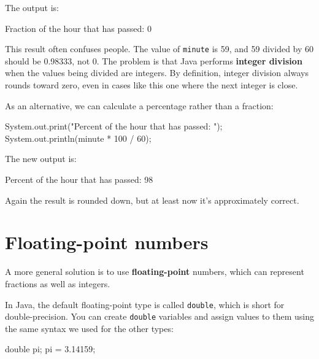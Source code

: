 \documentclass[12pt]{book}
\theoremstyle{exercise}
\newcommand{\java}[1]{\verb"#1"}
\begin{document}
The output is:

\begin{stdout}
Fraction of the hour that has passed: 0
\end{stdout}


This result often confuses people.
The value of \java{minute} is 59, and 59 divided by 60 should be 0.98333, not 0.
The problem is that Java performs {\bf integer division} when the values being divided are integers.
By definition, integer division always rounds toward zero, even in cases like this one where the next integer is close.

As an alternative, we can calculate a percentage rather than a fraction:

\begin{code}
    System.out.print("Percent of the hour that has passed: ");
    System.out.println(minute * 100 / 60);
\end{code}

The new output is:

\begin{stdout}
Percent of the hour that has passed: 98
\end{stdout}

Again the result is rounded down, but at least now it's approximately correct.


\section{Floating-point numbers}


A more general solution is to use {\bf floating-point} numbers, which can represent fractions as well as integers.

In Java, the default floating-point type is called \java{double}, which is short for double-precision.
You can create \java{double} variables and assign values to them using the same syntax we used for the other types:

\begin{code}
    double pi;
    pi = 3.14159;
\end{code}
\end{document}
